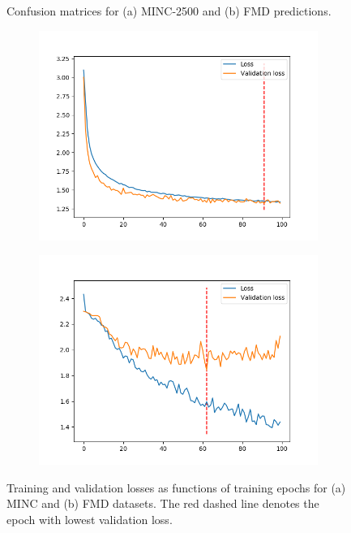 \documentclass[12pt,a4paper]{article}
\begin{document}
\begin{figure}
\begin{subfigure}[c]{0.7\linewidth}
			\vspace{-7mm}
			\caption{}
			\label{fig:conffmd}
			\vspace{2mm}
		\end{subfigure}
		\caption{Confusion matrices for (a) MINC-2500 and (b) FMD predictions.}
		\label{fig:conf}
	\end{figure}

	\begin{figure}[t!]
		\centering
		\begin{subfigure}[c]{0.49\linewidth}
			\includegraphics[width=\linewidth]{imgs/loss_history_minc}
			\caption{}
			\label{fig:lossminc}
		\end{subfigure}
		\begin{subfigure}[c]{0.49\linewidth}
			\includegraphics[width=\linewidth]{imgs/loss_history_fmd}
			\caption{}
			\label{fig:lossfmd}
		\end{subfigure}
		\caption{Training and validation losses as functions of training epochs for (a) MINC and (b) FMD datasets. The red dashed line denotes the epoch with lowest validation loss.}
		\label{fig:losses}
	\end{figure}
\end{document}
